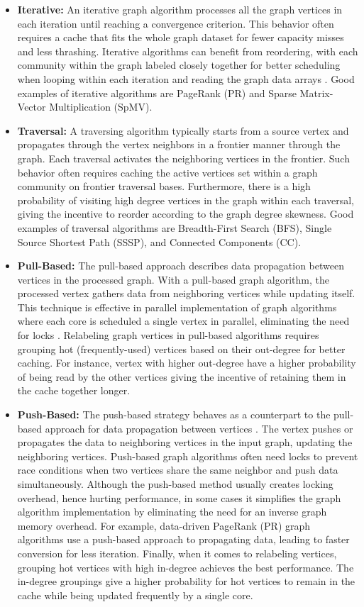 \documentclass[sigconf, nonacm]{acmart}
\begin{document}
\begin{itemize}[topsep=2pt,itemsep=2pt,wide]
\item \textbf{Iterative:} An iterative graph algorithm processes all the graph vertices in each iteration until reaching a convergence criterion. This behavior often requires a cache that fits the whole graph dataset for fewer capacity misses and less thrashing. Iterative algorithms can benefit from reordering, with each community \cite{arai_rabbit_2016} within the graph labeled closely together for better scheduling when looping within each iteration and reading the graph data arrays \cite{mukkara_exploiting_2018}. Good examples of iterative algorithms are PageRank (PR) and Sparse Matrix-Vector Multiplication (SpMV).
\item \textbf{Traversal:} A traversing algorithm typically starts from a source vertex and propagates through the vertex neighbors in a frontier manner through the graph. Each traversal activates the neighboring vertices in the frontier. Such behavior often requires caching the active vertices set within a graph community on frontier traversal bases. Furthermore, there is a high probability of visiting high degree vertices in the graph within each traversal, giving the incentive to reorder according to the graph degree skewness.  Good examples of traversal algorithms are Breadth-First Search (BFS), Single Source Shortest Path (SSSP), and Connected Components (CC).
\item \textbf{Pull-Based:} The pull-based approach describes data propagation between vertices in the processed graph. With a pull-based graph algorithm, the processed vertex gathers data from neighboring vertices while updating itself. This technique is effective in parallel implementation of graph algorithms where each core is scheduled a single vertex in parallel, eliminating the need for locks \cite{besta_push_2017}. Relabeling graph vertices in pull-based algorithms requires grouping hot (frequently-used) vertices based on their out-degree for better caching. For instance, vertex with higher out-degree have a higher probability of being read by the other vertices giving the incentive of retaining them in the cache together longer.
\item \textbf{Push-Based:} The push-based strategy behaves as a counterpart to the pull-based approach for data propagation between vertices \cite{besta_push_2017} . The vertex pushes or propagates the data to neighboring vertices in the input graph, updating the neighboring vertices. Push-based graph algorithms often need locks to prevent race conditions when two vertices share the same neighbor and push data simultaneously. Although the push-based method usually creates locking overhead, hence hurting performance, in some cases it simplifies the graph algorithm implementation by eliminating the need for an inverse graph memory overhead. For example, data-driven PageRank (PR) \cite{whang_scalable_2015} graph algorithms use a push-based approach to propagating data, leading to faster conversion for less iteration. Finally, when it comes to relabeling vertices, grouping hot vertices with high in-degree achieves the best performance. The in-degree groupings give a higher probability for hot vertices to remain in the cache while being updated frequently by a single core. 

\end{itemize}
\end{document}
